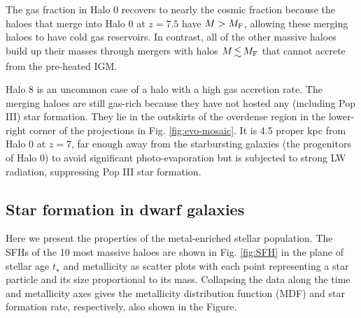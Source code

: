 \documentclass[useAMS,usenatbib]{mn2e}
\begin{document}
The gas fraction in Halo 0 recovers to nearly the cosmic fraction
because the haloes that merge into Halo 0 at $z=7.5$ have $M > M_{\rm
  F}$, allowing these merging haloes to have cold gas reservoirs.  In
contrast, all of the other massive haloes build up their masses
through mergers with halos $M \la M_{\rm F}$ that cannot accrete from
the pre-heated IGM.

Halo 8 is an uncommon case of a halo with a high gas accretion rate.
The merging haloes are still gas-rich because they have not hosted any
(including Pop III) star formation.  They lie in the outskirts of the
overdense region in the lower-right corner of the projections in
Fig. \ref{fig:evo-mosaic}.  It is 4.5 proper kpc from Halo 0 at $z=7$,
far enough away from the starbursting galaxies (the progenitors of
Halo 0) to avoid significant photo-evaporation but is subjected to
strong LW radiation, suppressing Pop III star formation.

\subsection{Star formation in dwarf galaxies}

\begin{figure*}
  \caption{\label{fig:SFH} The scatter plots show the Pop II star
    formation history as a function of stellar age $t_\star$ with
    respect to metallicity for the 10 most massive halos.  Halo 8 is
    not shown because it contains no stars.  Each circle represents a
    star particle, whose area is proportional to its mass.  The open
    circles in the upper right represent $M = 10^3$, $10^4$, and
    $10^5$ \Ms.  The dashed lines in the Halo 0 panel guide the eye to
    two stellar populations that were formed in two satellite halos,
    merging at $z=7.5$.  The upper histogram shows the star formation
    rate with each bar representing 5 Myr.  The right histogram
    depicts the Pop II metallicity distribution function.}
\end{figure*}

Here we present the properties of the metal-enriched stellar
population.  The SFHs of the 10 most massive haloes are shown in
Fig. \ref{fig:SFH} in the plane of stellar age $t_\star$ and
metallicity as scatter plots with each point representing a star
particle and its size proportional to its mass.  Collapsing the data
along the time and metallicity axes gives the metallicity distribution
function (MDF) and star formation rate, respectively, also shown in
the Figure.
\end{document}
